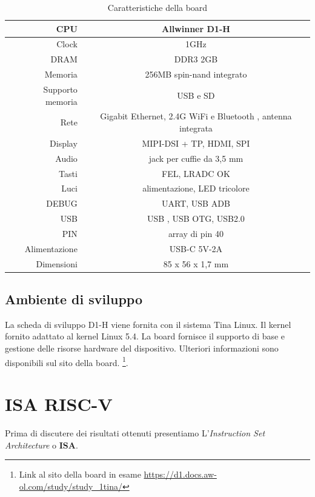 \documentclass[12pt,a4paper]{report}
\begin{document}
\begin{table}[ht]
\centering
\begin{tabular}{| r | c |}
\hline
CPU & Allwinner D1-H \\
\hline
Clock & 1GHz\\
\hline
DRAM & DDR3 2GB\\
\hline
Memoria & 256MB  spin-nand integrato\\
\hline 
Supporto memoria & USB e  SD\\
\hline
Rete & Gigabit Ethernet,  2.4G WiFi e Bluetooth , antenna integrata\\
\hline
Display & MIPI-DSI + TP, HDMI, SPI \\
\hline
Audio & jack per cuffie da 3,5 mm\\
\hline
Tasti & FEL, LRADC OK\\
\hline
Luci &  alimentazione, LED tricolore\\
\hline
DEBUG & UART, USB ADB\\
\hline
USB & USB , USB OTG, USB2.0\\
\hline
PIN & array di pin 40\\
\hline
Alimentazione & USB-C  5V-2A\\
\hline
Dimensioni &  85 x 56 x 1,7 mm\\
\hline

\end{tabular}
\caption{Caratteristiche della board}
\end{table}

\section{Ambiente di sviluppo}
La scheda di sviluppo D1-H viene fornita con il sistema Tina Linux. Il kernel fornito  adattato al kernel Linux 5.4. La board fornisce il supporto di base e gestione delle risorse hardware del dispositivo. Ulteriori informazioni sono disponibili sul sito della board.
\footnote{Link al sito della board in esame \url{https://d1.docs.aw-ol.com/study/study_1tina/}}.

% 
\chapter{ISA RISC-V}
Prima di discutere dei risultati ottenuti presentiamo L'\textit{Instruction Set Architecture} o \textbf{ISA}.
\end{document}
